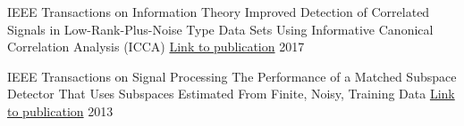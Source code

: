 

\begin{cvhonors}

  \cvhonor
    {IEEE Transactions on Information Theory} %
    {Improved Detection of Correlated Signals in Low-Rank-Plus-Noise Type Data Sets Using
      Informative Canonical Correlation Analysis (ICCA) \href{https://ieeexplore.ieee.org/abstract/document/7903598}{\textcolor{awesome-red}{Link to
              publication}}} %
    {} %
    {2017} %


  \cvhonor
    {IEEE Transactions on Signal Processing} %
    {The Performance of a Matched Subspace Detector That Uses Subspaces Estimated From
      Finite, Noisy, Training Data \href{https://ieeexplore.ieee.org/abstract/document/6415288}{\textcolor{awesome-red}{Link to
              publication}}} %
    {} %
    {2013} %


\end{cvhonors}
